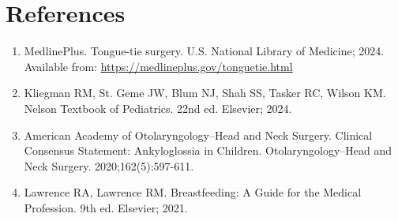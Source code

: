 \section*{References}
\begin{enumerate}
  \item MedlinePlus. Tongue-tie surgery. U.S. National Library of Medicine; 2024. Available from: \url{https://medlineplus.gov/tonguetie.html}
  
  \item Kliegman RM, St. Geme JW, Blum NJ, Shah SS, Tasker RC, Wilson KM. Nelson Textbook of Pediatrics. 22nd ed. Elsevier; 2024.
  
  \item American Academy of Otolaryngology--Head and Neck Surgery. Clinical Consensus Statement: Ankyloglossia in Children. Otolaryngology--Head and Neck Surgery. 2020;162(5):597-611.
  
  \item Lawrence RA, Lawrence RM. Breastfeeding: A Guide for the Medical Profession. 9th ed. Elsevier; 2021.
\end{enumerate}

\clearpage
